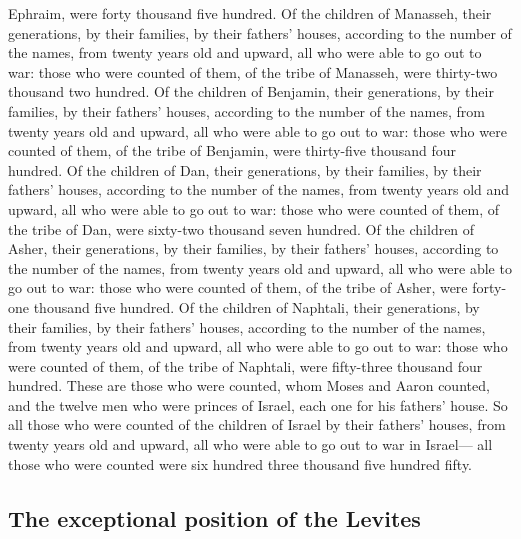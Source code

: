 Ephraim, were forty thousand five hundred.  Of the
children of Manasseh, their generations, by their families, by their
fathers' houses, according to the number of the names, from twenty years
old and upward, all who were able to go out to war: 
those who were counted of them, of the tribe of Manasseh, were
thirty-two thousand two hundred.  Of the children of
Benjamin, their generations, by their families, by their fathers'
houses, according to the number of the names, from twenty years old and
upward, all who were able to go out to war:  those who
were counted of them, of the tribe of Benjamin, were thirty-five
thousand four hundred.  Of the children of Dan, their
generations, by their families, by their fathers' houses, according to
the number of the names, from twenty years old and upward, all who were
able to go out to war:  those who were counted of them,
of the tribe of Dan, were sixty-two thousand seven hundred.
 Of the children of Asher, their generations, by their
families, by their fathers' houses, according to the number of the
names, from twenty years old and upward, all who were able to go out to
war:  those who were counted of them, of the tribe of
Asher, were forty-one thousand five hundred.  Of the
children of Naphtali, their generations, by their families, by their
fathers' houses, according to the number of the names, from twenty years
old and upward, all who were able to go out to war: 
those who were counted of them, of the tribe of Naphtali, were
fifty-three thousand four hundred.  These are those who
were counted, whom Moses and Aaron counted, and the twelve men who were
princes of Israel, each one for his fathers' house.  So
all those who were counted of the children of Israel by their fathers'
houses, from twenty years old and upward, all who were able to go out to
war in Israel---  all those who were counted were six
hundred three thousand five hundred fifty.

\hypertarget{the-exceptional-position-of-the-levites}{%
\subsection{The exceptional position of the
Levites}\label{the-exceptional-position-of-the-levites}}

